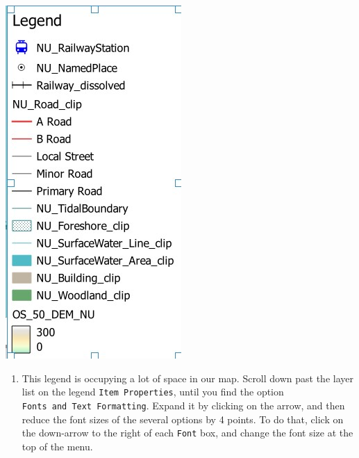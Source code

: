 \documentclass[
  letterpaper,
  DIV=11,
  numbers=noendperiod]{scrreprt}
\providecommand{\tightlist}{%
  \setlength{\itemsep}{0pt}\setlength{\parskip}{0pt}}\usepackage{longtable,booktabs,array}
\begin{document}
\includegraphics{images/lab_8/lab8_fig11_cleaner_legend.jpg}

\begin{enumerate}
\def\labelenumi{(\arabic{enumi})}
\setcounter{enumi}{244}
\tightlist
\item
  This legend is occupying a lot of space in our map. Scroll down past
  the layer list on the legend \texttt{Item\ Properties}, until you find
  the option \texttt{Fonts\ and\ Text\ Formatting}. Expand it by
  clicking on the arrow, and then reduce the font sizes of the several
  options by 4 points. To do that, click on the down-arrow to the right
  of each \texttt{Font} box, and change the font size at the top of the
  menu.
\end{enumerate}
\end{document}
